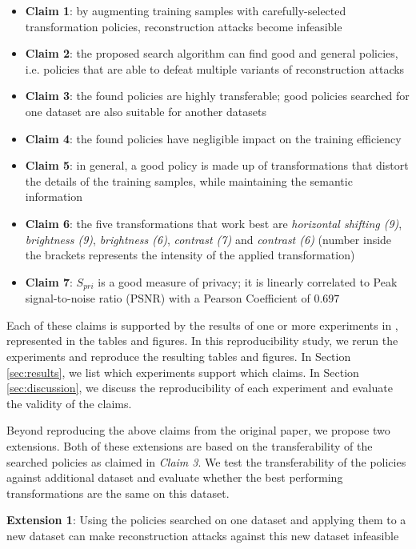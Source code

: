 \begin{itemize}[noitemsep,topsep=-3pt]
\itemsep0em 
\item \textbf{Claim 1}: by  augmenting training samples with carefully-selected transformation  policies,  reconstruction attacks become infeasible
\item \textbf{Claim 2}: the proposed search algorithm can find good and general policies, i.e. policies that are able to defeat multiple variants of reconstruction attacks
\item \textbf{Claim 3}: the found policies are highly transferable; good policies searched for one dataset are also suitable for another datasets
\item \textbf{Claim 4}: the found policies have negligible impact on the training efficiency
\item \textbf{Claim 5}: in general, a good policy is made up of transformations that distort the details of the training samples, while maintaining the semantic information
\item \textbf{Claim 6}: the five transformations that work best are \emph{horizontal shifting (9)}, \emph{brightness (9)}, \emph{brightness (6)}, \emph{contrast (7)} and \emph{contrast (6)} (number inside the brackets represents the intensity of the applied transformation)
\item \textbf{Claim 7}: $S_{pri}$ is a good measure of privacy; it is linearly correlated to Peak signal-to-noise ratio (PSNR) \cite{hore2010} with a Pearson Coefficient \cite{stigler1989} of $0.697$
\end{itemize}

Each of these claims is supported by the results of one or more experiments in \cite{gao2021privacy}, represented in the tables and figures. In this reproducibility study, we rerun the experiments and reproduce the resulting tables and figures. In Section \ref{sec:results}, we list which experiments support which claims. In Section \ref{sec:discussion}, we discuss the reproducibility of each experiment and evaluate the validity of the claims.

Beyond reproducing the above claims from the original paper, we propose two extensions. Both of these extensions are based on the transferability of the searched policies as claimed in \emph{Claim 3}. We test the transferability of the policies against additional dataset and evaluate whether the best performing transformations are the same on this dataset.

\textbf{Extension 1}: Using the policies searched on one dataset and applying them to a new dataset can make reconstruction attacks against this new dataset infeasible

